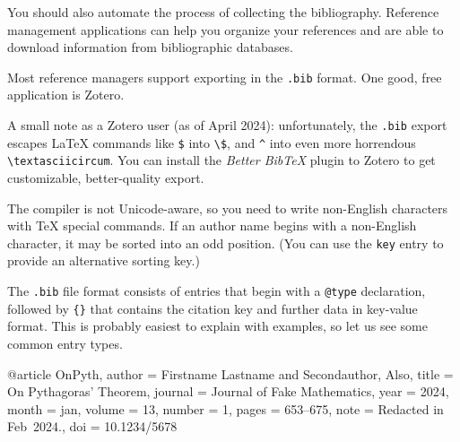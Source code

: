 \begin{practices}
You should also automate the process of collecting the bibliography.
Reference management applications can help you organize your references
and are able to download information from bibliographic databases.

Most reference managers support exporting in the \verb|.bib| format.
One good, free application is Zotero\footnotemark.

A small note as a Zotero user (as of April 2024):
unfortunately, the \verb|.bib| export escapes \LaTeX{} commands like \verb|$| into \verb|\$|,
and \verb|^| into even more horrendous \verb|\textasciicircum|.
You can install the \emph{Better BibTeX} plugin to Zotero to get
customizable, better-quality export.\footnotemark
\end{practices}

\begin{gotcha}
The  compiler is not Unicode-aware,
so you need to write non-English characters with \TeX{} special commands.
If an author name begins with a non-English character,
it may be sorted into an odd position.
(You can use the \verb|key| entry to provide an alternative sorting key.)
\end{gotcha}

The \verb|.bib| file format consists of entries that begin with a \verb|@type| declaration,
followed by \verb|{}| that contains the citation key
and further data in key-value format.
This is probably easiest to explain with examples,
so let us see some common entry types.

\begin{ExampleCode}
@article {OnPyth,
    author = {Firstname Lastname and Secondauthor, Also},
    title = {On {Pythagoras'} Theorem},
    journal = {Journal of Fake Mathematics},
    year = {2024},
    month = {jan},
    volume = {13},
    number = {1},
    pages = {653--675},
    note = {Redacted in Feb~2024.},
    doi = {10.1234/5678}
}
\end{ExampleCode}

